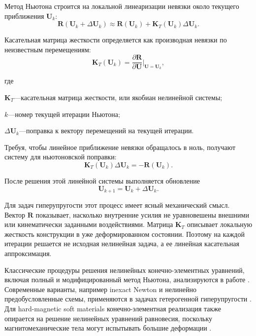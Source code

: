 \documentclass[14pt,a4paper]{extarticle}
\newif\ifwherefirst
\newcommand{\whereitem}[2]{%
    \ifwherefirst
        \wherefirstfalse
        #1\hspace{0.25em}---\hspace{0.25em}#2\par
    \else
        \noindent\hspace*{\parindent}\hphantom{где\enspace}#1\hspace{0.25em}---\hspace{0.25em}#2\par
    \fi
}
\newenvironment{whereblock}{%
    \vspace*{-1.55\baselineskip}%
    \begingroup
    \singlespacing
    \wherefirsttrue
    \par\indent где\enspace\ignorespaces
}{%
    \par\endgroup
    \par\vspace{\baselineskip}
}
\begin{document}
Метод Ньютона строится на локальной линеаризации невязки около текущего приближения \(\mathbf{U}_k\):
\begin{equation}
    \mathbf{R}(\mathbf{U}_k+\Delta\mathbf{U}_k)
    \approx
    \mathbf{R}(\mathbf{U}_k)
    +
    \mathbf{K}_T(\mathbf{U}_k)\Delta\mathbf{U}_k.
\end{equation}

Касательная матрица жесткости определяется как производная невязки по неизвестным перемещениям:
\begin{equation}
    \mathbf{K}_T(\mathbf{U}_k)
    =
    \frac{\partial \mathbf{R}}{\partial \mathbf{U}}
    \bigg|_{\mathbf{U}=\mathbf{U}_k},
\end{equation}
\begin{whereblock}
\whereitem{\(\mathbf{K}_T\)}{касательная матрица жесткости, или якобиан нелинейной системы;}
\whereitem{\(k\)}{номер текущей итерации Ньютона;}
\whereitem{\(\Delta\mathbf{U}_k\)}{поправка к вектору перемещений на текущей итерации.}
\end{whereblock}

Требуя, чтобы линейное приближение невязки обращалось в ноль, получают систему для ньютоновской поправки:
\begin{equation}
    \mathbf{K}_T(\mathbf{U}_k)\Delta\mathbf{U}_k
    =
    -\mathbf{R}(\mathbf{U}_k).
\end{equation}

После решения этой линейной системы выполняется обновление
\begin{equation}
    \mathbf{U}_{k+1}
    =
    \mathbf{U}_k+\Delta\mathbf{U}_k.
\end{equation}

Для задач гиперупругости этот процесс имеет ясный механический смысл. Вектор \(\mathbf{R}\) показывает, насколько внутренние усилия не уравновешены внешними или кинематически заданными воздействиями. Матрица \(\mathbf{K}_T\) описывает локальную жесткость конструкции в уже деформированном состоянии. Поэтому на каждой итерации решается не исходная нелинейная задача, а ее линейная касательная аппроксимация.

Классические процедуры решения нелинейных конечно-элементных уравнений, включая полный и модифицированный метод Ньютона, анализируются в работе \cite{bathe1980}. Современные варианты, например inexact Newton и нелинейно предобусловленные схемы, применяются в задачах гетерогенной гиперупругости \cite{gong2019}. Для hard-magnetic soft materials конечно-элементная реализация также опирается на решение нелинейных уравнений равновесия, поскольку магнитомеханические тела могут испытывать большие деформации \cite{zhao2019}.
\end{document}
